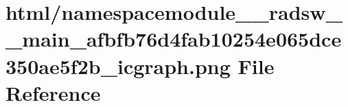 \hypertarget{namespacemodule____radsw____main__afbfb76d4fab10254e065dce350ae5f2b__icgraph_8png}{}\section{html/namespacemodule\+\_\+\+\_\+radsw\+\_\+\+\_\+main\+\_\+afbfb76d4fab10254e065dce350ae5f2b\+\_\+icgraph.png File Reference}
\label{namespacemodule____radsw____main__afbfb76d4fab10254e065dce350ae5f2b__icgraph_8png}
